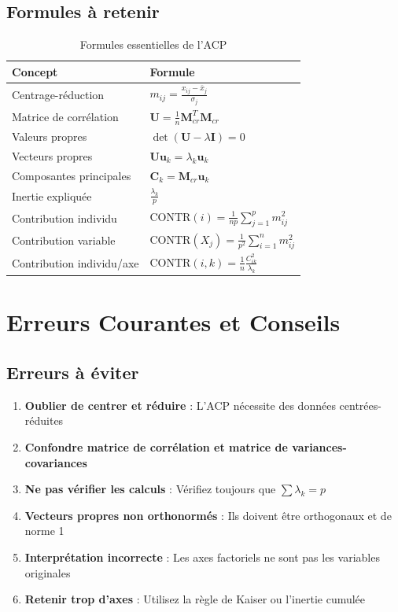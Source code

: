 \documentclass[11pt,a4paper]{article}
\begin{document}
\subsection{Formules à retenir}

\begin{table}[h]
\centering
\begin{tabular}{|l|l|}
\hline
\textbf{Concept} & \textbf{Formule} \\
\hline
Centrage-réduction & $m_{ij} = \frac{x_{ij} - \bar{x}_j}{\sigma_j}$ \\
\hline
Matrice de corrélation & $\mathbf{U} = \frac{1}{n}\mathbf{M}_{cr}^T\mathbf{M}_{cr}$ \\
\hline
Valeurs propres & $\det(\mathbf{U} - \lambda\mathbf{I}) = 0$ \\
\hline
Vecteurs propres & $\mathbf{U}\mathbf{u}_k = \lambda_k\mathbf{u}_k$ \\
\hline
Composantes principales & $\mathbf{C}_k = \mathbf{M}_{cr}\mathbf{u}_k$ \\
\hline
Inertie expliquée & $\frac{\lambda_k}{p}$ \\
\hline
Contribution individu & $\text{CONTR}(i) = \frac{1}{np}\sum_{j=1}^{p} m_{ij}^2$ \\
\hline
Contribution variable & $\text{CONTR}(X_j) = \frac{1}{p^2}\sum_{i=1}^{n} m_{ij}^2$ \\
\hline
Contribution individu/axe & $\text{CONTR}(i, k) = \frac{1}{n}\frac{C_{ik}^2}{\lambda_k}$ \\
\hline
\end{tabular}
\caption{Formules essentielles de l'ACP}
\end{table}

\newpage

\section{Erreurs Courantes et Conseils}

\subsection{Erreurs à éviter}

\begin{enumerate}
    \item \textbf{Oublier de centrer et réduire} : L'ACP nécessite des données centrées-réduites
    \item \textbf{Confondre matrice de corrélation et matrice de variances-covariances}
    \item \textbf{Ne pas vérifier les calculs} : Vérifiez toujours que $\sum \lambda_k = p$
    \item \textbf{Vecteurs propres non orthonormés} : Ils doivent être orthogonaux et de norme 1
    \item \textbf{Interprétation incorrecte} : Les axes factoriels ne sont pas les variables originales
    \item \textbf{Retenir trop d'axes} : Utilisez la règle de Kaiser ou l'inertie cumulée
\end{enumerate}
\end{document}

